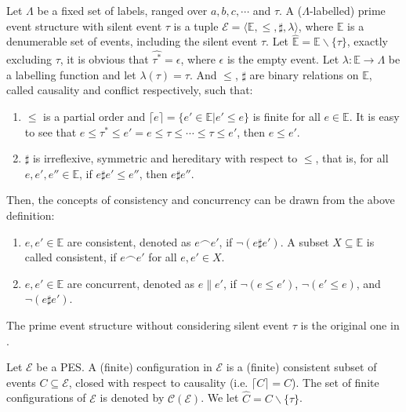 \begin{definition}\label{PES}
Let $\Lambda$ be a fixed set of labels, ranged over $a,b,c,\cdots$ and $\tau$. A ($\Lambda$-labelled) prime event structure with silent event $\tau$ is a tuple $\mathcal{E}=\langle \mathbb{E}, \leq, \sharp, \lambda\rangle$, where $\mathbb{E}$ is a denumerable set of events, including the silent event $\tau$. Let $\hat{\mathbb{E}}=\mathbb{E}\backslash\{\tau\}$, exactly excluding $\tau$, it is obvious that $\hat{\tau^*}=\epsilon$, where $\epsilon$ is the empty event. Let $\lambda:\mathbb{E}\rightarrow\Lambda$ be a labelling function and let $\lambda(\tau)=\tau$. And $\leq$, $\sharp$ are binary relations on $\mathbb{E}$, called causality and conflict respectively, such that:

\begin{enumerate}
  \item $\leq$ is a partial order and $\lceil e \rceil = \{e'\in \mathbb{E}|e'\leq e\}$ is finite for all $e\in \mathbb{E}$. It is easy to see that $e\leq\tau^*\leq e'=e\leq\tau\leq\cdots\leq\tau\leq e'$, then $e\leq e'$.
  \item $\sharp$ is irreflexive, symmetric and hereditary with respect to $\leq$, that is, for all $e,e',e''\in \mathbb{E}$, if $e\sharp e'\leq e''$, then $e\sharp e''$.
\end{enumerate}

Then, the concepts of consistency and concurrency can be drawn from the above definition:

\begin{enumerate}
  \item $e,e'\in \mathbb{E}$ are consistent, denoted as $e\frown e'$, if $\neg(e\sharp e')$. A subset $X\subseteq \mathbb{E}$ is called consistent, if $e\frown e'$ for all $e,e'\in X$.
  \item $e,e'\in \mathbb{E}$ are concurrent, denoted as $e\parallel e'$, if $\neg(e\leq e')$, $\neg(e'\leq e)$, and $\neg(e\sharp e')$.
\end{enumerate}
\end{definition}

The prime event structure without considering silent event $\tau$ is the original one in \cite{ES1} \cite{ES2} \cite{CM}.

\begin{definition}[Configuration]
Let $\mathcal{E}$ be a PES. A (finite) configuration in $\mathcal{E}$ is a (finite) consistent subset of events $C\subseteq \mathcal{E}$, closed with respect to causality (i.e. $\lceil C\rceil=C$). The set of finite configurations of $\mathcal{E}$ is denoted by $\mathcal{C}(\mathcal{E})$. We let $\hat{C}=C\backslash\{\tau\}$.
\end{definition}

